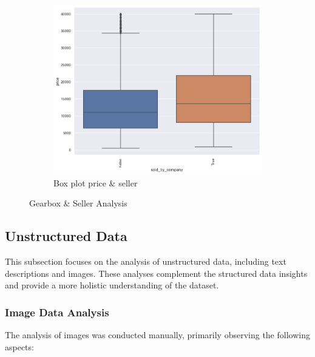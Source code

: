 \begin{itemize}
\begin{figure}[!h]
\begin{subfigure}[b]{0.48\linewidth}
            \includegraphics[width=\linewidth]{images/priceprediction/boxplots/sold_by_company_price.png}
            \caption{Box plot price \& seller}
            \label{fig:seller-box}
        \end{subfigure}
        \caption{Gearbox \& Seller Analysis}
        \label{fig:gearbox-seller-analysis}
    \end{figure}
    
\end{itemize}

\subsection{Unstructured Data}
This subsection focuses on the analysis of unstructured data, including text descriptions and images. These analyses complement the structured data insights and provide a more holistic understanding of the dataset.


\subsubsection{Image Data Analysis}

The analysis of images was conducted manually, primarily observing the following aspects:

